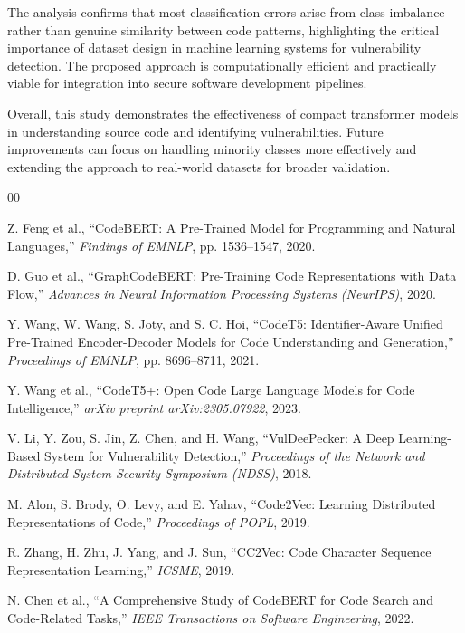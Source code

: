 \documentclass[conference]{IEEEtran}
\begin{document}
The analysis confirms that most classification errors arise from class imbalance rather than genuine similarity between code patterns, highlighting the critical importance of dataset design in machine learning systems for vulnerability detection. The proposed approach is computationally efficient and practically viable for integration into secure software development pipelines.

Overall, this study demonstrates the effectiveness of compact transformer models in understanding source code and identifying vulnerabilities. Future improvements can focus on handling minority classes more effectively and extending the approach to real-world datasets for broader validation.

\begin{thebibliography}{00}

Z. Feng et al.,
``CodeBERT: A Pre-Trained Model for Programming and Natural Languages,''
\emph{Findings of EMNLP}, pp. 1536--1547, 2020.

D. Guo et al.,
``GraphCodeBERT: Pre-Training Code Representations with Data Flow,''
\emph{Advances in Neural Information Processing Systems (NeurIPS)}, 2020.

Y. Wang, W. Wang, S. Joty, and S. C. Hoi,
``CodeT5: Identifier-Aware Unified Pre-Trained Encoder-Decoder Models for Code Understanding and Generation,''
\emph{Proceedings of EMNLP}, pp. 8696--8711, 2021.

Y. Wang et al.,
``CodeT5+: Open Code Large Language Models for Code Intelligence,''
\emph{arXiv preprint arXiv:2305.07922}, 2023.

V. Li, Y. Zou, S. Jin, Z. Chen, and H. Wang,
``VulDeePecker: A Deep Learning-Based System for Vulnerability Detection,''
\emph{Proceedings of the Network and Distributed System Security Symposium (NDSS)}, 2018.

M. Alon, S. Brody, O. Levy, and E. Yahav,
``Code2Vec: Learning Distributed Representations of Code,''
\emph{Proceedings of POPL}, 2019.

R. Zhang, H. Zhu, J. Yang, and J. Sun,
``CC2Vec: Code Character Sequence Representation Learning,''
\emph{ICSME}, 2019.

N. Chen et al.,
``A Comprehensive Study of CodeBERT for Code Search and Code-Related Tasks,''
\emph{IEEE Transactions on Software Engineering}, 2022.


\end{thebibliography}
\end{document}
